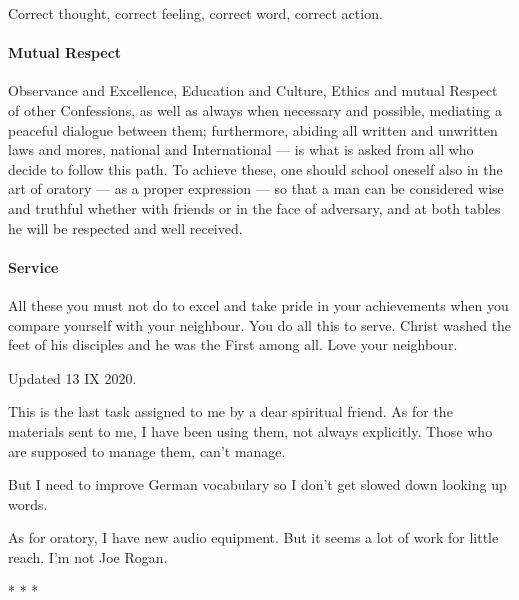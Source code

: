 Correct thought, correct feeling, correct word, correct action.

\paragraph{Mutual Respect}
Observance and Excellence, Education and Culture, Ethics and mutual Respect of other Confessions, as well as always when necessary and possible, mediating a peaceful dialogue between them; furthermore, abiding all written and unwritten laws and mores, national and International — is what is asked from all who decide to follow this path. To achieve these, one should school oneself also in the art of oratory — as a proper expression — so that a man can be considered wise and truthful whether with friends or in the face of adversary, and at both tables he will be respected and well received.

\paragraph{Service}
All these you must not do to excel and take pride in your achievements when you compare yourself with your neighbour. You do all this to serve. Christ washed the feet of his disciples and he was the First among all. Love your neighbour.


\hfill

Updated 13 IX 2020.

This is the last task assigned to me by a dear spiritual friend. As for the materials sent to me, I have been using them, not always explicitly. Those who are supposed to manage them, can't manage.

But I need to improve German vocabulary so I don't get slowed down looking up words.

As for oratory, I have new audio equipment. But it seems a lot of work for little reach. I'm not Joe Rogan.




\begin{center}* * *\end{center}


